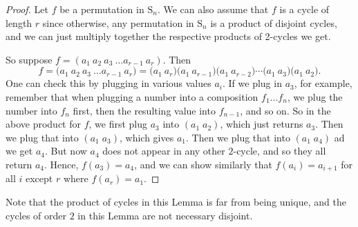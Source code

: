 \documentclass[11pt,dvipsnames]{book}
\numberwithin{figure}{section} %
\numberwithin{table}{section} %
\begin{document}
\begin{proof}  Let $f$ be a permutation in
$\mathrm{S}_n$. We can also assume that $f$ is a cycle of length $r$ since otherwise, any permutation in $\mathrm{S}_n$ is a product of
disjoint cycles, and we can just multiply together the respective products of 2-cycles we get.

So suppose $f=(a_1\ a_2\ a_3\ \ldots a_{r-1}\ a_r)$. 
Then
$$
f=\big(a_1\ a_2\ a_3\ \ldots a_{r-1}\ a_r\big)=\big(a_1\ a_{r}\big)\big(a_1\ a_{r-1}\big)\big(a_1\ a_{r-2}\big)\cdots \big(a_1\ a_{3}\big)\big(a_1\ a_{2}\big).%
$$
One can check this by plugging in various values $a_i$. If we plug in $a_3$, for example, remember that when plugging a number into a composition $f_{1}...f_{n}$, we plug the number into $f_n$ first, then the resulting value into $f_{n-1}$, and so on. So in the above product for $f$, we first plug $a_3$ into $(a_{1}\; a_{2})$, which just returns $a_{3}$. Then we plug that into $(a_{1}\; a_{3})$, which gives $a_{1}$. Then we plug that into $(a_{1}\; a_{4})$ ad we get $a_{4}$. But now $a_{4}$ does not appear in any other $2$-cycle, and so they all return $a_{4}$. Hence, $f(a_{3})=a_{4}$, and we can show similarly that $f(a_{i})=a_{i+1}$ for all $i$ except $r$ where $f(a_{r})=a_{1}$.
\end{proof}

Note that the product of cycles in this Lemma is far from being
unique, and the cycles of order $2$ in this Lemma are not necessary
disjoint.



%
%
%
%
%
%
%
%
%
%
%
\end{document}
